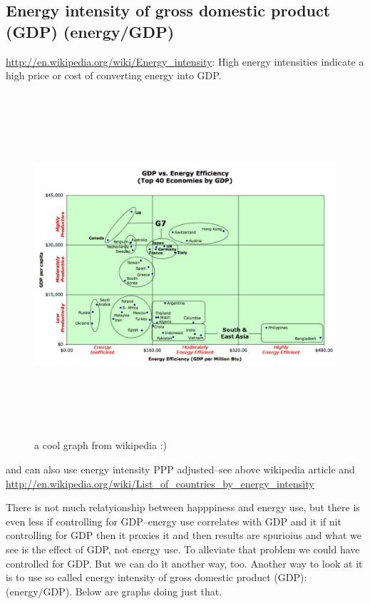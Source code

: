\documentclass[10pt, letterpaper]{article}
\begin{document}
\begin{spacing}{1.4}
\subsection{Energy intensity of gross domestic product (GDP) (energy/GDP)}

\url{http://en.wikipedia.org/wiki/Energy_intensity}:
High energy intensities indicate a high price or cost of converting energy into GDP.
 
\begin{figure}[H]
 \includegraphics[height=5in]{graphsAndTables/Gdp-energy-efficiency.pdf}\centering
\caption{a cool graph from wikipedia :)}\label{}
\end{figure}
and can also use energy intensity PPP adjusted--see above wikipedia article and \url{http://en.wikipedia.org/wiki/List_of_countries_by_energy_intensity}

There is not much relatyionship between happpiness and energy use, but there is
even less if controlling for GDP--energy use correlates with GDP and it if nit
controlling for GDP then it proxies it and then results are spurioius and what
we see is the effect of GDP, not energy use.  
To alleviate that problem we could have controlled for GDP. But we can do it
another way, too. 
Another way to look at it is to use so called energy intensity of gross domestic
product (GDP): (energy/GDP). Below  are graphs doing just that.



\end{spacing}
\end{document}
